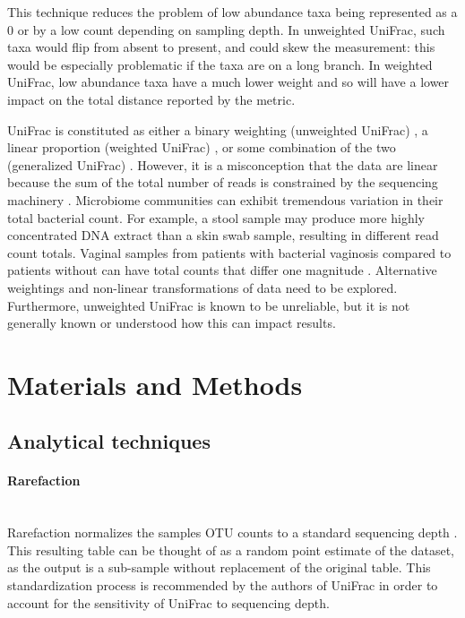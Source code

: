 \documentclass[10pt,letterpaper]{article}
\begin{document}
This technique reduces the problem of low abundance taxa being represented as a 0 or by a low count depending on sampling depth. In unweighted UniFrac, such taxa would flip from absent to present, and could skew the measurement: this would be especially problematic if the taxa are on a long branch. In weighted UniFrac, low abundance taxa have a much lower weight and so will have a lower impact on the total distance reported by the metric.

UniFrac is constituted as either a binary weighting (unweighted UniFrac) \cite{lozupone2005unifrac}, a linear proportion (weighted UniFrac) \cite{lozupone2007quantitative}, or some combination of the two (generalized UniFrac) \cite{chen2012associating}. However, it is a misconception that the data are linear because the sum of the total number of reads is constrained by the sequencing machinery \cite{friedman2012inferring} \cite{fernandes2013anova} \cite{fernandes2014unifying} \cite{lovell2015proportionality}. Microbiome communities can exhibit tremendous variation in their total bacterial count. For example, a stool sample may produce more highly concentrated DNA extract than a skin swab sample, resulting in different read count totals. Vaginal samples from patients with bacterial vaginosis compared to patients without can have total counts that differ one magnitude \cite{qzozaya2010quantitative}. Alternative weightings and non-linear transformations of data need to be explored. Furthermore, unweighted UniFrac is known to be unreliable, but it is not generally known or understood how this can impact results.

\section*{Materials and Methods}

\subsection{Analytical techniques}

\paragraph{Rarefaction}\mbox{}\\
Rarefaction normalizes the samples OTU counts to a standard sequencing depth \cite{simberloff1978use}. This resulting table can be thought of as a random point estimate of the dataset, as the output is a sub-sample without replacement of the original table. This standardization process is recommended by the authors of UniFrac \cite{de2011evaluation} in order to account for the sensitivity of UniFrac to sequencing depth.
\end{document}
